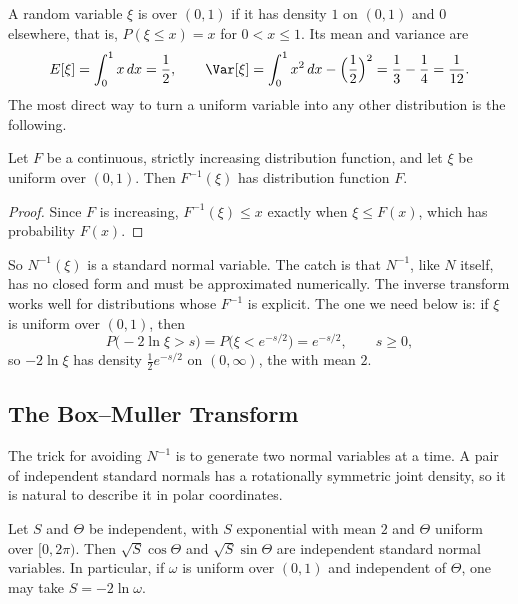 A random variable $\xi$ is  over $(0,1)$ if it has density $1$ on $(0,1)$ and $0$ elsewhere, that is, $P(\xi\le x)=x$ for $0<x\le1$.
Its mean and variance are
\[
	E[\xi]=\int_{0}^{1}x\,dx=\frac12 ,
	\qquad
	\Var[\xi]=\int_{0}^{1}x^{2}\,dx-\Bigl(\frac12\Bigr)^{2}=\frac13-\frac14=\frac{1}{12} .
\]
The most direct way to turn a uniform variable into any other distribution is the following.

\begin{proposition}\label{prop:inverse-transform}
	Let $F$ be a continuous, strictly increasing distribution function, and let $\xi$ be uniform over $(0,1)$.
	Then $F^{-1}(\xi)$ has distribution function $F$.
\end{proposition}

\begin{proof}
	Since $F$ is increasing, $F^{-1}(\xi)\le x$ exactly when $\xi\le F(x)$, which has probability $F(x)$.
\end{proof}

So $N^{-1}(\xi)$ is a standard normal variable.
The catch is that $N^{-1}$, like $N$ itself, has no closed form and must be approximated numerically.
The inverse transform works well for distributions whose $F^{-1}$ is explicit.
The one we need below is: if $\xi$ is uniform over $(0,1)$, then
\begin{equation}
	P\bigl(-2\ln\xi>s\bigr)=P\bigl(\xi<e^{-s/2}\bigr)=e^{-s/2} ,
	\qquad s\ge0 , \label{eq:exp-from-uniform}
\end{equation}
so $-2\ln\xi$ has density $\tfrac12e^{-s/2}$ on $(0,\infty)$, the  with mean $2$.

\subsection{The Box--Muller Transform}

The trick for avoiding $N^{-1}$ is to generate two normal variables at a time.
A pair of independent standard normals has a rotationally symmetric joint density, so it is natural to describe it in polar coordinates.

\begin{theorem}\label{thm:box-muller}
	Let $S$ and $\Theta$ be independent, with $S$ exponential with mean $2$ and $\Theta$ uniform over $[0,2\pi)$.
	Then $\sqrt{S}\cos\Theta$ and $\sqrt{S}\sin\Theta$ are independent standard normal variables.
	In particular, if $\omega$ is uniform over $(0,1)$ and independent of $\Theta$, one may take $S=-2\ln\omega$.
\end{theorem}

